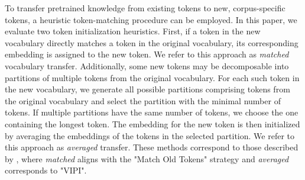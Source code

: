 \documentclass[11pt]{article}
\begin{document}




To transfer pretrained knowledge from existing tokens to new, corpus-specific tokens, a heuristic token-matching procedure can be employed. In this paper, we evaluate two token initialization heuristics. First, if a token in the new vocabulary directly matches a token in the original vocabulary, its corresponding embedding is assigned to the new token. We refer to this approach as \textit{matched} vocabulary transfer. Additionally, some new tokens may be decomposable into partitions of multiple tokens from the original vocabulary. For each such token in the new vocabulary, we generate all possible partitions comprising tokens from the original vocabulary and select the partition with the minimal number of tokens. If multiple partitions have the same number of tokens, we choose the one containing the longest token. The embedding for the new token is then initialized by averaging the embeddings of the tokens in the selected partition. We refer to this approach as \textit{averaged} transfer. These methods correspond to those described by \citet{mosin2023fine}, where \textit{matched} aligns with the "Match Old Tokens" strategy and \textit{averaged} corresponds to "VIPI".
\end{document}
